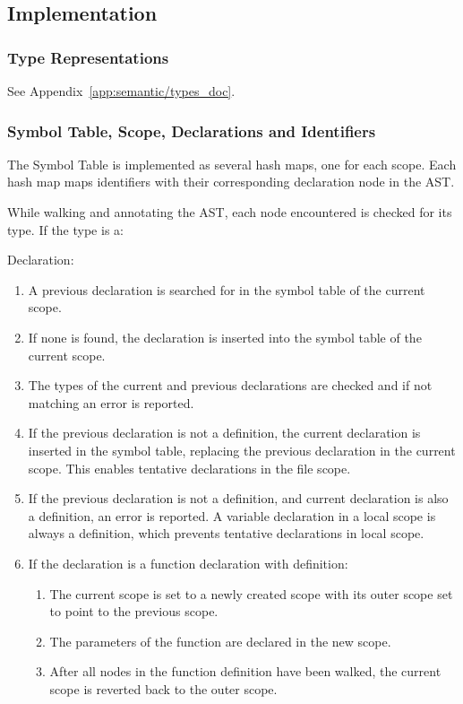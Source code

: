 \subsection{Implementation}

\subsubsection{Type Representations}

See Appendix~\ref{app:semantic/types_doc}.

\subsubsection{Symbol Table, Scope, Declarations and Identifiers}

The Symbol Table is implemented as several hash maps, one for each scope. Each hash map maps identifiers with their corresponding declaration node in the AST.

While walking and annotating the AST, each node encountered is checked for its type. If the type is a:

Declaration:
\begin{enumerate}
	\item A previous declaration is searched for in the symbol table of the current scope.
	\item If none is found, the declaration is inserted into the symbol table of the current scope.
	\item The types of the current and previous declarations are checked and if not matching an error is reported.
	\item If the previous declaration is not a definition, the current declaration is inserted in the symbol table, replacing the previous declaration in the current scope. This enables tentative declarations in the file scope.
	\item If the previous declaration is not a definition, and current declaration is also a definition, an error is reported. A variable declaration in a local scope is always a definition, which prevents tentative declarations in local scope.
	\item If the declaration is a function declaration with definition:
	\begin{enumerate}[1.]
		\item The current scope is set to a newly created scope with its outer scope set to point to the previous scope.
		\item The parameters of the function are declared in the new scope.
		\item After all nodes in the function definition have been walked, the current scope is reverted back to the outer scope.
	\end{enumerate}
\end{enumerate}

